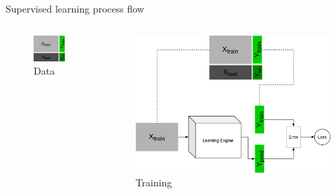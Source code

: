 \begin{frame}{Supervised learning process flow}
	\begin{columns}
		\begin{column}{.5\textwidth}
			\begin{figure}
				\includegraphics[width=.85\textwidth, center]{figures/ml_1_data}
				\caption*{Data}
			\end{figure}
		\end{column}
		\begin{column}{.5\textwidth}
			\begin{figure}
				\includegraphics[width=1.\textwidth, center]{figures/ml_1_train}
				\caption*{Training}
			\end{figure}
		\end{column}
	\end{columns}
\end{frame}

